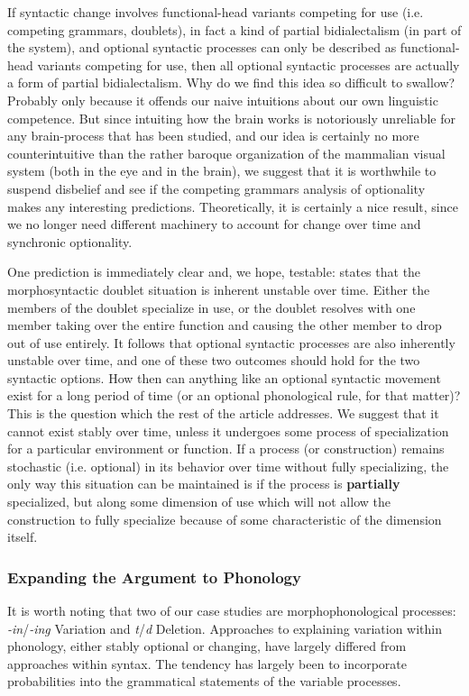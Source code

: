 If syntactic change involves functional-head variants competing for use (i.e. competing grammars, doublets), in fact a kind of partial bidialectalism (in part of the system), and optional syntactic processes can only be described as functional-head variants competing for use, then all optional syntactic processes are actually a form of partial bidialectalism.
Why do we find this idea so difficult to swallow? Probably only because it offends our naive intuitions about our own linguistic competence.
But since intuiting how the brain works is notoriously unreliable for any brain-process that has been studied, and our idea is certainly no more counterintuitive than the rather baroque organization of the mammalian visual system (both in the eye and in the brain), we suggest that it is worthwhile to suspend disbelief and see if the competing grammars analysis of optionality makes any interesting predictions.
Theoretically, it is certainly a nice result, since we no longer need different machinery to account for change over time and synchronic optionality.


One prediction is immediately clear and, we hope, testable: \citet{kroch1989,kroch1994} states that the morphosyntactic doublet situation is inherent unstable over time.
Either the members of the doublet specialize in use, or the doublet resolves with one member taking over the entire function and causing the other member to drop out of use entirely.
It follows that optional syntactic processes are also inherently unstable over time, and one of these two outcomes should hold for the two syntactic options.
How then can anything like an optional syntactic movement exist for a long period of time (or an optional phonological rule, for that matter)? This is the question which the rest of the article addresses.
We suggest that it cannot exist stably over time, unless it undergoes some process of specialization for a particular environment or function.
If a process (or construction) remains stochastic (i.e. optional) in its behavior over time without fully specializing, the only way this situation can be maintained is if the process is \textbf{partially} specialized, but along some dimension of use which will not allow the construction to fully specialize because of some characteristic of the dimension itself.

\subsubsection{Expanding the Argument to Phonology}
It is worth noting that two of our case studies are morphophonological processes: {\sl -in}/{\sl -ing} Variation and {\sl t}/{\sl d} Deletion.
Approaches to explaining variation within phonology, either stably optional or changing, have largely differed from approaches within syntax.
The tendency has largely been to incorporate probabilities into the grammatical statements of the variable processes.

